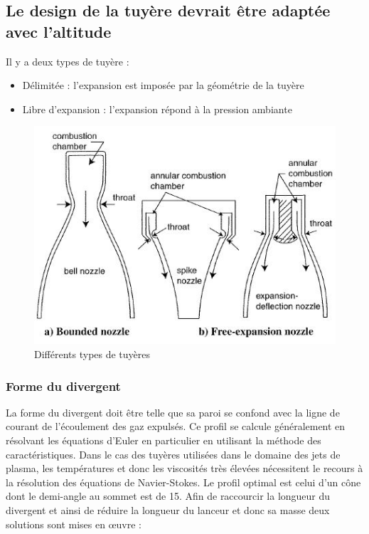 \documentclass{report}
\begin{document}
\subsection{Le design de la tuyère devrait être adaptée avec l'altitude}

Il y a deux types de tuyère :
\begin{itemize}
    \item Délimitée : l'expansion est imposée par la géométrie de la tuyère
    \item Libre d'expansion : l'expansion répond à la pression ambiante
\end{itemize}

\begin{figure}[h!]
    \centering
    \includegraphics[scale=0.7]{47.JPG}
    \caption{Différents types de tuyères}
    \label{47}
\end{figure}

\subsubsection{Forme du divergent}

La forme du divergent doit être telle que sa paroi se confond avec la ligne de courant de l'écoulement des gaz expulsés. Ce profil se calcule généralement en résolvant les équations d'Euler en particulier en utilisant la méthode des caractéristiques. Dans le cas des tuyères utilisées dans le domaine des jets de plasma, les températures et donc les viscosités très élevées nécessitent le recours à la résolution des équations de Navier-Stokes. Le profil optimal est celui d'un cône dont le demi-angle au sommet est de 15\degree. Afin de raccourcir la longueur du divergent et ainsi de réduire la longueur du lanceur et donc sa masse deux solutions sont mises en œuvre :
\end{document}
